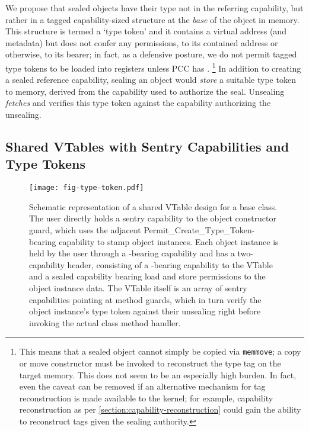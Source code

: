We propose that sealed objects have their type not in the referring
capability, but rather in a tagged capability-sized structure at the
\emph{base} of the object in memory.  This structure is termed a `type
token' and it contains a virtual address (and metadata) but does not confer
any permissions, to its contained address or otherwise, to its bearer; in
fact, as a defensive posture, we do not permit tagged type tokens to be
loaded into registers unless PCC has \cappermASR.%
%
\footnote{This means that a sealed object cannot simply be copied via
\texttt{memmove}; a copy or move constructor must be invoked to reconstruct
the type tag on the target memory.  This does not seem to be an especially
high burden.  In fact, even the \cappermASR caveat can
be removed if an alternative mechanism for tag reconstruction is made
available to the kernel; for example, capability reconstruction as per
\cref{section:capability-reconstruction} could gain the ability to
reconstruct tags given the sealing authority.}
%
In addition to creating a sealed reference capability, sealing an object
would \emph{store} a suitable type token to memory, derived from the
capability used to authorize the seal.  Unsealing \emph{fetches} and
verifies this type token against the capability authorizing the unsealing.

\subsection{Shared VTables with Sentry Capabilities and Type Tokens} %
\label{app:exp:typetoken:vt}

\begin{figure}[htb] %
  \centering
  \texttt{[image: fig-type-token.pdf]}

  \caption{Schematic representation of a shared VTable design for a base class.
  The user directly holds a sentry capability to the object constructor guard,
  which uses the adjacent Permit\_Create\_Type\_Token-bearing capability to
  stamp object instances.  Each object instance is held by the user through a
  \cappermLC-bearing capability and has a two-capability header,
  consisting of a \cappermLC-bearing capability to the VTable and
  a sealed capability bearing load and store permissions to the object instance
  data.  The VTable itself is an array of sentry capabilities pointing at
  method guards, which in turn verify the object instance's type token against
  their unsealing right before invoking the actual class method handler.}
  \label{fig:app:exp:typetoken:vt}

\end{figure} %

